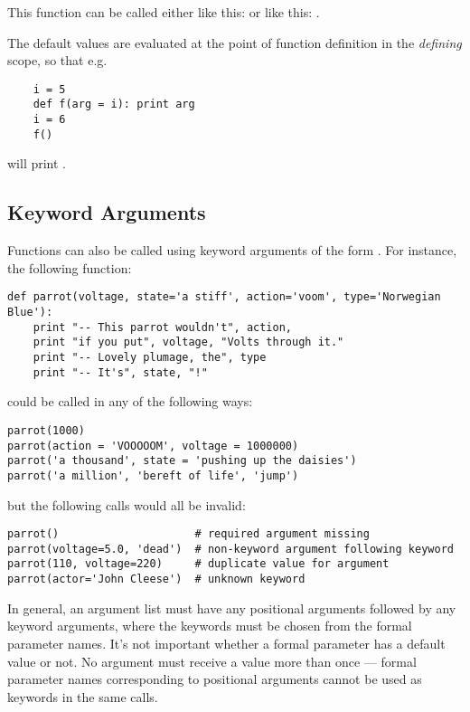 This function can be called either like this:
 or like this:
.

The default values are evaluated at the point of function definition
in the \emph{defining} scope, so that e.g.

\begin{verbatim}
    i = 5
    def f(arg = i): print arg
    i = 6
    f()
\end{verbatim}

will print .

\subsection{Keyword Arguments}

Functions can also be called using
keyword arguments of the form .  For
instance, the following function:

\begin{verbatim}
def parrot(voltage, state='a stiff', action='voom', type='Norwegian Blue'):
    print "-- This parrot wouldn't", action,
    print "if you put", voltage, "Volts through it."
    print "-- Lovely plumage, the", type
    print "-- It's", state, "!"
\end{verbatim}

could be called in any of the following ways:

\begin{verbatim}
parrot(1000)
parrot(action = 'VOOOOOM', voltage = 1000000)
parrot('a thousand', state = 'pushing up the daisies')
parrot('a million', 'bereft of life', 'jump')
\end{verbatim}

but the following calls would all be invalid:

\begin{verbatim}
parrot()                     # required argument missing
parrot(voltage=5.0, 'dead')  # non-keyword argument following keyword
parrot(110, voltage=220)     # duplicate value for argument
parrot(actor='John Cleese')  # unknown keyword
\end{verbatim}

In general, an argument list must have any positional arguments
followed by any keyword arguments, where the keywords must be chosen
from the formal parameter names.  It's not important whether a formal
parameter has a default value or not.  No argument must receive a
value more than once --- formal parameter names corresponding to
positional arguments cannot be used as keywords in the same calls.

